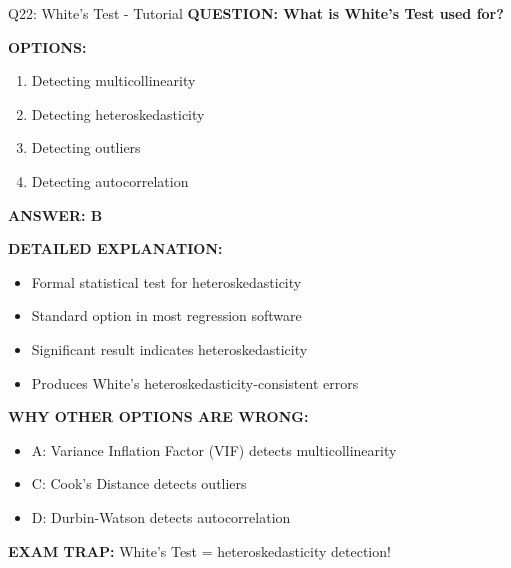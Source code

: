 \documentclass[8pt]{beamer}
\begin{document}
	\begin{frame}{Q22: White's Test - Tutorial}
		\fontsize{6.5}{7.5}\selectfont
		\textbf{QUESTION: What is White's Test used for?}
		
		\vspace{0.1cm}
		\textbf{OPTIONS:}
		\begin{enumerate}
			\item Detecting multicollinearity
			\item Detecting heteroskedasticity
			\item Detecting outliers
			\item Detecting autocorrelation
		\end{enumerate}
		
		\vspace{0.1cm}
		\textcolor{myblue}{\textbf{ANSWER: B}}
		
		\vspace{0.1cm}
		\textbf{DETAILED EXPLANATION:}
		\begin{itemize}
			\item Formal statistical test for heteroskedasticity
			\item Standard option in most regression software
			\item Significant result indicates heteroskedasticity
			\item Produces White's heteroskedasticity-consistent errors
		\end{itemize}
		
		\vspace{0.1cm}
		\textcolor{myred}{\textbf{WHY OTHER OPTIONS ARE WRONG:}}
		\begin{itemize}
			\item \textcolor{myred}{A:} Variance Inflation Factor (VIF) detects multicollinearity
			\item \textcolor{myred}{C:} Cook's Distance detects outliers
			\item \textcolor{myred}{D:} Durbin-Watson detects autocorrelation
		\end{itemize}
		
		\textcolor{myred}{\textbf{EXAM TRAP:}} White's Test = \textcolor{myblue}{heteroskedasticity detection}!
	\end{frame}
	
\end{document}
